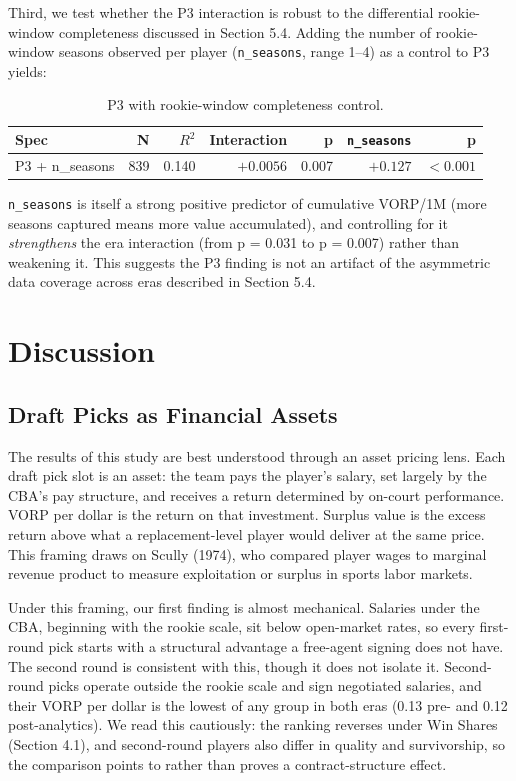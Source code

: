 \documentclass[12pt,letterpaper]{article}
\begin{document}
Third, we test whether the P3 interaction is robust to the differential rookie-window completeness discussed in Section 5.4. Adding the number of rookie-window seasons observed per player (\texttt{n\_seasons}, range 1--4) as a control to P3 yields:

\begin{table}[ht]
\centering
\small
\setlength{\tabcolsep}{5pt}
\begin{tabular}{@{}lrrrrrr@{}}
\toprule
\textbf{Spec} & \textbf{N} & \textbf{$R^2$} & \textbf{Interaction} & \textbf{p} & \textbf{\texttt{n\_seasons}} & \textbf{p} \\
\midrule
P3 + n\_seasons & 839 & 0.140 & $+0.0056$ & 0.007 & $+0.127$ & $<0.001$ \\
\bottomrule
\end{tabular}
\caption{P3 with rookie-window completeness control.}
\end{table}

\texttt{n\_seasons} is itself a strong positive predictor of cumulative VORP/1M (more seasons captured means more value accumulated), and controlling for it \emph{strengthens} the era interaction (from p = 0.031 to p = 0.007) rather than weakening it. This suggests the P3 finding is not an artifact of the asymmetric data coverage across eras described in Section 5.4.

\section{Discussion}

\subsection{Draft Picks as Financial Assets}

The results of this study are best understood through an asset pricing lens. Each draft pick slot is an asset: the team pays the player's salary, set largely by the CBA's pay structure, and receives a return determined by on-court performance. VORP per dollar is the return on that investment. Surplus value is the excess return above what a replacement-level player would deliver at the same price. This framing draws on Scully (1974), who compared player wages to marginal revenue product to measure exploitation or surplus in sports labor markets.

Under this framing, our first finding is almost mechanical. Salaries under the CBA, beginning with the rookie scale, sit below open-market rates, so every first-round pick starts with a structural advantage a free-agent signing does not have. The second round is consistent with this, though it does not isolate it. Second-round picks operate outside the rookie scale and sign negotiated salaries, and their VORP per dollar is the lowest of any group in both eras (0.13 pre- and 0.12 post-analytics). We read this cautiously: the ranking reverses under Win Shares (Section 4.1), and second-round players also differ in quality and survivorship, so the comparison points to rather than proves a contract-structure effect.
\end{document}
